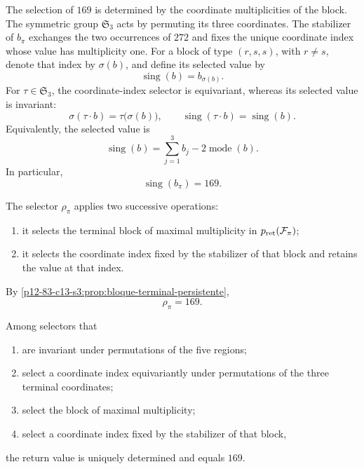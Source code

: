 The selection of \(169\) is determined by the coordinate multiplicities
of the block. The symmetric group \(\mathfrak S_3\) acts by permuting its
three coordinates. The stabilizer of \(b_\pi\) exchanges the two occurrences
of \(272\) and fixes the unique coordinate index whose value has
multiplicity one. For a block of type \((r,s,s)\), with \(r\ne s\), denote
that index by \(\sigma(b)\), and define its selected value by
\[
\operatorname{sing}(b)=b_{\sigma(b)}.
\]
For \(\tau\in\mathfrak S_3\), the coordinate-index selector is equivariant,
whereas its selected value is invariant:
\[
\sigma(\tau\cdot b)=\tau\bigl(\sigma(b)\bigr),
\qquad
\operatorname{sing}(\tau\cdot b)=\operatorname{sing}(b).
\]
Equivalently, the selected value is
\[
\operatorname{sing}(b)
=\sum_{j=1}^3b_j-2\operatorname{mode}(b).
\]
In particular,
\[
\boxed{\operatorname{sing}(b_\pi)=169.}
\]

\begin{definition}
\label{p12-83-c13-s3:def:selector-residual-pi}
The selector \(\rho_\pi\) applies two successive operations:
\begin{enumerate}
  \item it selects the terminal block of maximal multiplicity in
  \(p_{\rm ret}(\mathcal F_\pi)\);
  \item it selects the coordinate index fixed by the stabilizer of that
  block and retains the value at that index.
\end{enumerate}
By \cref{p12-83-c13-s3:prop:bloque-terminal-persistente},
\[
\boxed{\rho_\pi=169.}
\]
\end{definition}

\begin{theorem}
\label{p12-83-c13-s3:thm:unicidad-retorno-169}
Among selectors that
\begin{enumerate}
  \item are invariant under permutations of the five regions;
  \item select a coordinate index equivariantly under permutations of the
  three terminal coordinates;
  \item select the block of maximal multiplicity;
  \item select a coordinate index fixed by the stabilizer of that block,
\end{enumerate}
the return value is uniquely determined and equals \(169\).
\end{theorem}


